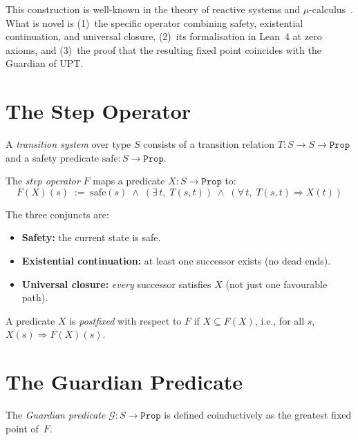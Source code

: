 This construction is well-known in the theory of reactive systems and $\mu$-calculus~\cite{park1969,kozen1983}. What is novel is (1)~the specific operator combining safety, existential continuation, and universal closure, (2)~its formalisation in Lean~4 at zero axioms, and (3)~the proof that the resulting fixed point coincides with the Guardian of UPT.

\section{The Step Operator}

\begin{definition}\label{def:ts}
A \emph{transition system} over type $S$ consists of a transition relation $T : S \to S \to \texttt{Prop}$ and a safety predicate $\mathrm{safe} : S \to \texttt{Prop}$.
\end{definition}

\begin{definition}\label{def:step-op}
The \emph{step operator} $F$ maps a predicate $X : S \to \texttt{Prop}$ to:
\[
F(X)(s) \;:=\; \mathrm{safe}(s) \;\wedge\; (\exists\, t,\; T(s,t)) \;\wedge\; (\forall\, t,\; T(s,t) \Rightarrow X(t))
\]
\end{definition}

The three conjuncts are:
\begin{itemize}
\item \textbf{Safety:} the current state is safe.
\item \textbf{Existential continuation:} at least one successor exists (no dead ends).
\item \textbf{Universal closure:} \emph{every} successor satisfies $X$ (not just one favourable path).
\end{itemize}

\begin{definition}\label{def:postfixed}
A predicate $X$ is \emph{postfixed} with respect to $F$ if $X \subseteq F(X)$, i.e., for all $s$, $X(s) \Rightarrow F(X)(s)$.
\end{definition}

\section{The Guardian Predicate}

\begin{definition}[Guardian]\label{def:guardian}
The \emph{Guardian predicate} $\mathcal{G} : S \to \texttt{Prop}$ is defined coinductively as the greatest fixed point of~$F$.
\end{definition}

